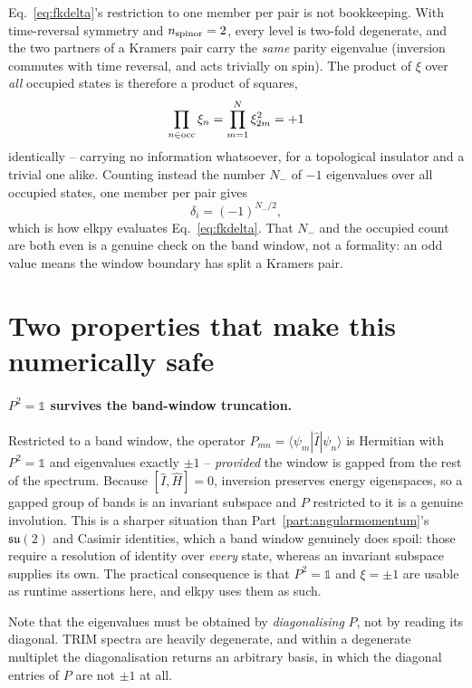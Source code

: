 \documentclass[11pt]{article}
\begin{document}
Eq.~\eqref{eq:fkdelta}'s restriction to one member per pair is not bookkeeping. With
time-reversal symmetry and $n_{\rm spinor}=2$, every level is two-fold degenerate, and
the two partners of a Kramers pair carry the \emph{same} parity eigenvalue (inversion
commutes with time reversal, and acts trivially on spin). The product of $\xi$ over
\emph{all} occupied states is therefore a product of squares,
\begin{equation}
  \prod_{n\in\rm occ}\xi_n=\prod_{m=1}^{N}\xi_{2m}^2=+1
\end{equation}
identically -- carrying no information whatsoever, for a topological insulator and a
trivial one alike. Counting instead the number $N_-$ of $-1$ eigenvalues over all
occupied states, one member per pair gives
\begin{equation}
  \delta_i=(-1)^{N_-/2},
  \label{eq:deltacount}
\end{equation}
which is how elkpy evaluates Eq.~\eqref{eq:fkdelta}. That $N_-$ and the occupied count
are both even is a genuine check on the band window, not a formality: an odd value means
the window boundary has split a Kramers pair.

\section{Two properties that make this numerically safe}

\paragraph{$P^2=\mathbb 1$ survives the band-window truncation.} Restricted to a band
window, the operator $P_{mn}=\langle\psi_m|\hat I|\psi_n\rangle$ is Hermitian with
$P^2=\mathbb 1$ and eigenvalues exactly $\pm1$ -- \emph{provided} the window is gapped
from the rest of the spectrum. Because $[\hat I,\hat H]=0$, inversion preserves energy
eigenspaces, so a gapped group of bands is an invariant subspace and $P$ restricted to it
is a genuine involution. This is a sharper situation than
Part~\ref{part:angularmomentum}'s $\mathfrak{su}(2)$ and Casimir identities, which a band
window genuinely does spoil: those require a resolution of identity over \emph{every}
state, whereas an invariant subspace supplies its own. The practical consequence is that
$P^2=\mathbb 1$ and $\xi=\pm1$ are usable as runtime assertions here, and elkpy uses them
as such.

Note that the eigenvalues must be obtained by \emph{diagonalising} $P$, not by reading
its diagonal. TRIM spectra are heavily degenerate, and within a degenerate multiplet the
diagonalisation returns an arbitrary basis, in which the diagonal entries of $P$ are not
$\pm1$ at all.
\end{document}
